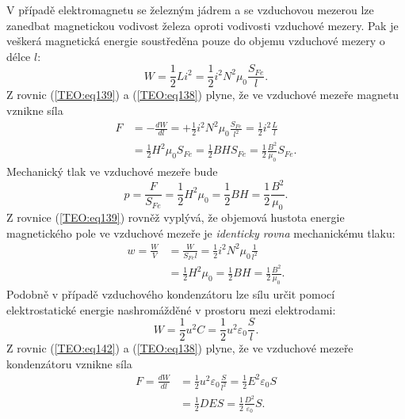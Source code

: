       V případě elektromagnetu se železným jádrem a se vzduchovou mezerou lze zanedbat magnetickou
      vodivost železa oproti vodivosti vzduchové mezery. Pak je veškerá magnetická energie 
      soustředěna pouze do objemu vzduchové mezery o délce \(l\):
      \begin{equation}\label{TEO:eq139}
        W =\frac{1}{2}Li^2 = \frac{1}{2}i^2N^2\mu_0\frac{S_{Fe}}{l}.
      \end{equation}
      Z rovnic (\ref{TEO:eq139}) a (\ref{TEO:eq138}) plyne, že ve vzduchové mezeře 
      magnetu vznikne síla
      \begin{align}\label{TEO:eq140}
         F &= -\frac{dW}{dl} 
            = +\frac{1}{2}i^2N^2\mu_0\frac{S_{Fe}}{l^2}
            =  \frac{1}{2}i^2\frac{L}{l}                                                \nonumber \\
           &=  \frac{1}{2}H^2\mu_0S_{Fe}=\frac{1}{2}BHS_{Fe} 
            =  \frac{1}{2}\frac{B^2}{\mu_0}S_{Fe}.
      \end{align}
      Mechanický tlak ve vzduchové mezeře bude
      \begin{equation}\label{TEO:eq141}
        p = \frac{F}{S_{Fe}} = \frac{1}{2}H^2\mu_0 = \frac{1}{2}BH = \frac{1}{2}\frac{B^2}{\mu_0}.
      \end{equation}
      Z rovnice (\ref{TEO:eq139}) rovněž vyplývá, že objemová hustota energie magnetického 
      pole ve vzduchové mezeře je \emph{identicky rovna} mechanickému tlaku:
      \begin{align*}
        w  = \frac{W}{V} 
          &= \frac{W}{S_{Fe}l} = \frac{1}{2}i^2N^2\mu_0\frac{1}{l^2}              \\
          &= \frac{1}{2}H^2\mu_0 = \frac{1}{2}BH = \frac{1}{2}\frac{B^2}{\mu_0}.
      \end{align*}
      Podobně v případě vzduchového kondenzátoru lze sílu určit pomocí elektrostatické energie
      nashromážděné v prostoru mezi elektrodami:
      \begin{equation}\label{TEO:eq142}
        W = \frac{1}{2}u^2C = \frac{1}{2}u^2\varepsilon_0\frac{S}{l}.
      \end{equation}
      Z rovnic (\ref{TEO:eq142}) a (\ref{TEO:eq138}) plyne, že ve vzduchové mezeře kondenzátoru
      vznikne síla
      \begin{align*}
        F  = \frac{dW}{dl} 
          &= \frac{1}{2}u^2\varepsilon_0\frac{S}{l^2}
           = \frac{1}{2}E^2\varepsilon_0S                                  \\
          &= \frac{1}{2}DES           
           = \frac{1}{2}\frac{D^2}{\varepsilon_0}S.
      \end{align*}
